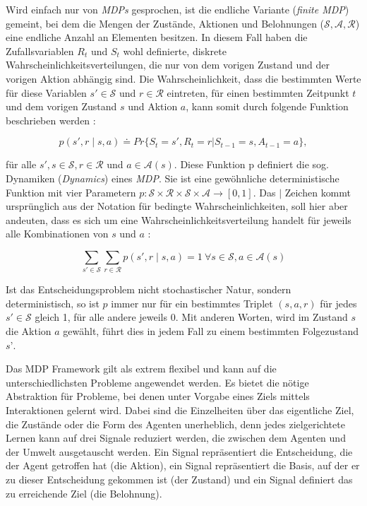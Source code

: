 Wird einfach nur von \textit{MDPs} gesprochen, ist die endliche Variante (\textit{finite MDP}) gemeint, bei dem die Mengen der Zustände, Aktionen und Belohnungen ($\mathcal{S}, \mathcal{A}, \mathcal{R}$) eine endliche Anzahl an Elementen besitzen. In diesem Fall haben die Zufallsvariablen $R_t$ und $S_t$ wohl definierte, diskrete Wahrscheinlichkeitsverteilungen, die nur von dem vorigen Zustand und der vorigen Aktion abhängig sind. Die Wahrscheinlichkeit, dass die bestimmten Werte für diese Variablen $s' \in \mathcal{S}$ und $r \in \mathcal{R}$ eintreten, für einen bestimmten Zeitpunkt $t$ und dem vorigen Zustand $s$ und Aktion $a$, kann somit durch folgende Funktion beschrieben werden \cite[~S.48]{Sutton1998}:

\begin{equation}\label{eq:übergangsfunktion}
p(s',r \mid s,a) \doteq Pr\{S_t=s',R_t=r|S_{t-1}=s,A_{t-1}=a\},
\end{equation}

für alle $s', s \in \mathcal{S}, r \in \mathcal{R}$ und $a \in \mathcal{A}(s)$. Diese Funktion p definiert die sog. Dynamiken (\textit{Dynamics}) eines \textit{MDP}. Sie ist eine gewöhnliche deterministische Funktion mit vier Parametern $p: \mathcal{S} \times \mathcal{R} \times \mathcal{S} \times \mathcal{A} \rightarrow [0,1]$. Das \glqq$\mid$\grqq{} Zeichen kommt ursprünglich aus der Notation für bedingte Wahrscheinlichkeiten, soll hier aber andeuten, dass es sich um eine Wahrscheinlichkeitsverteilung handelt für jeweils alle Kombinationen von $s$ und $a$ \cite[~S.49f]{Sutton1998}:

\begin{equation}\label{eq:wahrscheinlichkeitsverteilung}
\sum_{s' \in \mathcal{S}} \sum_{r \in \mathcal{R}} p(s', r \mid s,a) = 1 \ \forall s \in \mathcal{S}, a \in \mathcal{A}(s)
\end{equation}

Ist das Entscheidungsproblem nicht stochastischer Natur, sondern deterministisch, so ist $p$ immer nur für ein bestimmtes Triplet $(s,a,r)$ für jedes $s' \in \mathcal{S}$ gleich 1, für alle andere jeweils 0. Mit anderen Worten, wird im Zustand $s$ die Aktion $a$ gewählt, führt dies in jedem Fall zu einem bestimmten Folgezustand $s’$. 
\par 

Das MDP Framework gilt als extrem flexibel und kann auf die unterschiedlichsten Probleme angewendet werden. Es bietet die nötige Abstraktion für Probleme, bei denen unter Vorgabe eines Ziels mittels Interaktionen gelernt wird. Dabei sind die Einzelheiten über das eigentliche Ziel, die Zustände oder die Form des Agenten unerheblich, denn jedes zielgerichtete Lernen kann auf drei Signale reduziert werden, die zwischen dem Agenten und der Umwelt ausgetauscht werden. Ein Signal repräsentiert die Entscheidung, die der Agent getroffen hat (die Aktion), ein Signal repräsentiert die Basis, auf der er zu dieser Entscheidung gekommen ist (der Zustand) und ein Signal definiert das zu erreichende Ziel (die Belohnung)\cite[S.~50]{Sutton1998}.

